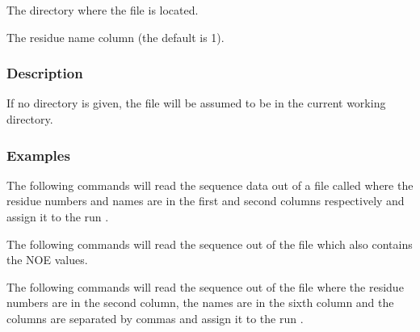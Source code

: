   The directory where the file is located.

  The residue name column (the default is 1).


\subsubsection{Description}

If no directory is given, the file will be assumed to be in the current working directory.


\subsubsection{Examples}

The following commands will read the sequence data out of a file called 
 where the
residue numbers and names are in the first and second columns respectively and assign it to
the run 
.






The following commands will read the sequence out of the file 
 which also contains
the NOE values.






The following commands will read the sequence out of the file 
 where the
residue numbers are in the second column, the names are in the sixth column and the columns
are separated by commas and assign it to the run 
.





\newpage

